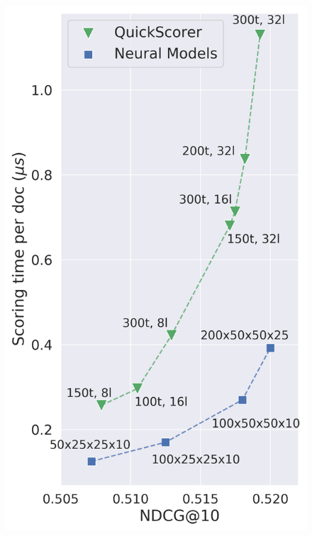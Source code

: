 \begin{figure}[t]
\begin{minipage}[b]{0.5\columnwidth}
\includegraphics[width=\columnwidth]{imgs/low_effectiveness_msn30k_stretched.png}
\centering 
\caption*{\footnotesize{\msn}}
\end{minipage}%
\begin{minipage}[b]{0.51\columnwidth}

\end{minipage}
\end{figure}
